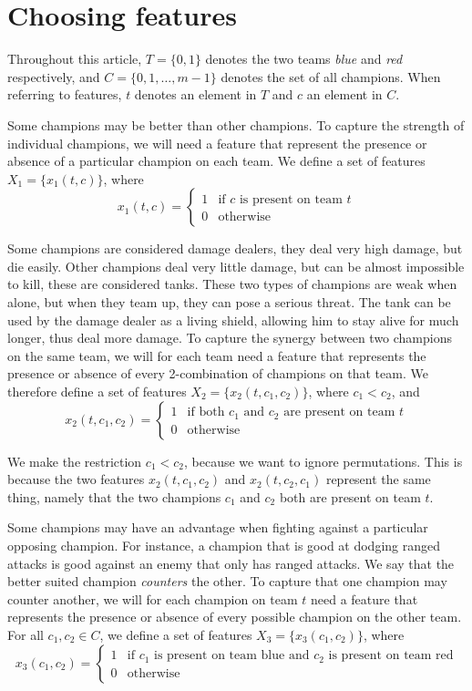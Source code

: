 \section{Choosing features}\label{sec:choosingfeatures}
Throughout this article, $T = \{0, 1\}$ denotes the two teams \emph{blue} and \emph{red} respectively, and $C = \{0, 1, \dots, m-1\}$ denotes the set of all champions. When referring to features, $t$ denotes an element in $T$ and $c$ an element in $C$.

Some champions may be better than other champions. To capture the strength of individual champions, we will need a feature that represent the presence or absence of a particular champion on each team.
We define a set of features $X_1 = \{x_1(t, c)\}$, where
\[
x_1(t, c) = 
\begin{cases} 
  1 & \text{if } c \text{ is present on team } t \\
  0 & \text{otherwise} 
\end{cases}
\]

Some champions are considered damage dealers, they deal very high damage, but die easily. Other champions deal very little damage, but can be almost impossible to kill, these are considered tanks. These two types of champions are weak when alone, but when they team up, they can pose a serious threat. The tank can be used by the damage dealer as a living shield, allowing him to stay alive for much longer, thus deal more damage.
To capture the synergy between two champions on the same team, we will for each team need a feature that represents the presence or absence of every 2-combination %
of champions on that team. We therefore define a set of features $X_2 = \{x_2(t, c_1, c_2)\}$, where $c_1 < c_2$, and
\[
x_2(t, c_1, c_2) = 
\begin{cases} 
1 & \text{if both } c_1 \text{ and } c_2 \text{ are present on team } t \\
0 & \text{otherwise} 
\end{cases}
\]

We make the restriction $c_1 < c_2$, because we want to ignore permutations. This is because the two features $x_2(t, c_1, c_2)$ and $x_2(t, c_2, c_1)$ represent the same thing, namely that the two champions $c_1$ and $c_2$ both are present on team $t$.

Some champions may have an advantage when fighting against a particular opposing champion.
For instance, a champion that is good at dodging ranged attacks is good against an enemy that only has ranged attacks.
We say that the better suited champion \emph{counters} the other.
To capture that one champion may counter another, we will for each champion on team $t$ need a feature that represents the presence or absence of every possible champion on the other team.
For all $c_1, c_2 \in C$, we define a set of features $X_3= \{x_3(c_1, c_2) \}$, where
\[x_3(c_1, c_2) = 
\begin{cases} 
1 & \text{if } c_1 \text{ is present on team blue and } c_2 \text{ is present on team red} \\ 
0 & \text{otherwise} 
\end{cases}\]

